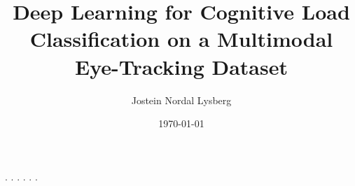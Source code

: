 \documentclass[american,titlepage]{ntnuthesis}
\title{Deep Learning for Cognitive Load Classification on a Multimodal Eye-Tracking Dataset}
\author{Jostein Nordal Lysberg}
\date{\today}
\begin{document}




\tableofcontents


\printnoidxglossaries

% 
% 

{.}
{.}
{.}
{.}
{.}
{.}
% 
% 
% 
% 

\chapter*{\bibname}
\printbibliography[heading=none]

\appendix

\end{document}
